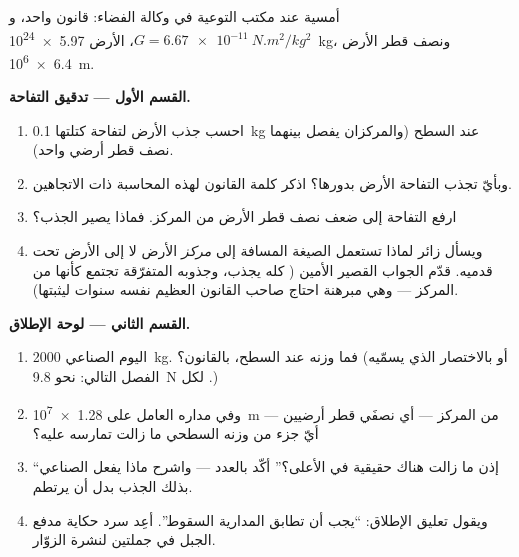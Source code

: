 \begin{problem}\label{pb:g9:gravitation:1}
أمسية عند مكتب التوعية في وكالة الفضاء: قانون واحد،
و$G = \qty{6.67e-11}{N.m^2/kg^2}$،  الأرض
\qty{5.97e24}{kg}، ونصف قطر الأرض \qty{6.4e6}{m}.

\medskip\noindent\textbf{القسم الأول --- تدقيق التفاحة.}
\begin{enumerate}
  \item احسب جذب الأرض لتفاحة كتلتها \qty{0.1}{kg} عند السطح
        (والمركزان يفصل بينهما نصف قطر أرضي واحد).
  \item وبأيّ  تجذب التفاحة الأرض بدورها؟ اذكر كلمة
        القانون لهذه المحاسبة ذات الاتجاهين.
  \item ارفع التفاحة إلى ضعف نصف قطر الأرض من المركز. فماذا
        يصير الجذب؟
  \item ويسأل زائر لماذا تستعمل الصيغة المسافة إلى
        \emph{مركز} الأرض لا إلى الأرض تحت قدميه. قدّم
        الجواب القصير الأمين ( كله يجذب، وجذوبه
        المتفرّقة تجتمع كأنها من المركز --- وهي مبرهنة
        احتاج صاحب القانون العظيم نفسه سنوات ليثبتها).
\end{enumerate}

\medskip\noindent\textbf{القسم الثاني --- لوحة الإطلاق.}
\begin{enumerate}[resume]
  \item {}  اليوم الصناعي \qty{2000}{kg}. فما وزنه عند
        السطح، بالقانون؟ (أو بالاختصار الذي يسمّيه الفصل
        التالي: نحو \qty{9.8}{N} لكل .)
  \item وفي مداره العامل على \qty{1.28e7}{m} من المركز ---
        أي نصفَي قطر أرضيين --- أيّ جزء من وزنه السطحي ما
        زالت  تمارسه عليه؟
  \item ``إذن ما زالت هناك  حقيقية في الأعلى؟'' أكّد
        بالعدد --- واشرح ماذا يفعل  الصناعي بذلك الجذب
        بدل أن يرتطم.
  \item ويقول تعليق الإطلاق: ``يجب أن تطابق  المدارية
        السقوط''. أعِد سرد حكاية مدفع الجبل في جملتين لنشرة
        الزوّار.
\end{enumerate}


\end{problem}
